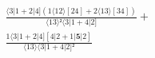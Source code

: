 \documentclass[varwidth, border=5pt]{standalone}
\begin{document}
\begin{my}
$\begin{gathered}
\scriptscriptstyle\frac{⟨3|1+2|4](1⟨12⟩[24]+2⟨13⟩[34])}{⟨13⟩²⟨3|1+4|2]} +\\
\scriptscriptstyle\frac{1⟨3|1+2|4][4|2+1|𝟓|2]}{⟨13⟩⟨3|1+4|2]²} \phantom{+}
\end{gathered}$
\end{my}
\end{document}
